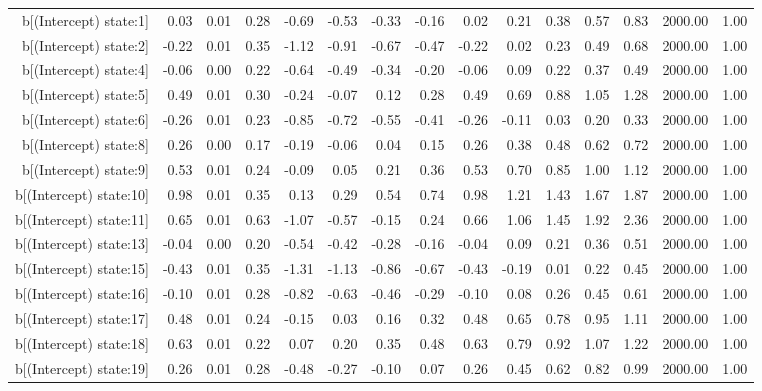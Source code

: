 \begin{table}[ht]
\begin{tabular}{rrrrrrrrrrrrrrr}
  b[(Intercept) state:1] & 0.03 & 0.01 & 0.28 & -0.69 & -0.53 & -0.33 & -0.16 & 0.02 & 0.21 & 0.38 & 0.57 & 0.83 & 2000.00 & 1.00 \\ 
  b[(Intercept) state:2] & -0.22 & 0.01 & 0.35 & -1.12 & -0.91 & -0.67 & -0.47 & -0.22 & 0.02 & 0.23 & 0.49 & 0.68 & 2000.00 & 1.00 \\ 
  b[(Intercept) state:4] & -0.06 & 0.00 & 0.22 & -0.64 & -0.49 & -0.34 & -0.20 & -0.06 & 0.09 & 0.22 & 0.37 & 0.49 & 2000.00 & 1.00 \\ 
  b[(Intercept) state:5] & 0.49 & 0.01 & 0.30 & -0.24 & -0.07 & 0.12 & 0.28 & 0.49 & 0.69 & 0.88 & 1.05 & 1.28 & 2000.00 & 1.00 \\ 
  b[(Intercept) state:6] & -0.26 & 0.01 & 0.23 & -0.85 & -0.72 & -0.55 & -0.41 & -0.26 & -0.11 & 0.03 & 0.20 & 0.33 & 2000.00 & 1.00 \\ 
  b[(Intercept) state:8] & 0.26 & 0.00 & 0.17 & -0.19 & -0.06 & 0.04 & 0.15 & 0.26 & 0.38 & 0.48 & 0.62 & 0.72 & 2000.00 & 1.00 \\ 
  b[(Intercept) state:9] & 0.53 & 0.01 & 0.24 & -0.09 & 0.05 & 0.21 & 0.36 & 0.53 & 0.70 & 0.85 & 1.00 & 1.12 & 2000.00 & 1.00 \\ 
  b[(Intercept) state:10] & 0.98 & 0.01 & 0.35 & 0.13 & 0.29 & 0.54 & 0.74 & 0.98 & 1.21 & 1.43 & 1.67 & 1.87 & 2000.00 & 1.00 \\ 
  b[(Intercept) state:11] & 0.65 & 0.01 & 0.63 & -1.07 & -0.57 & -0.15 & 0.24 & 0.66 & 1.06 & 1.45 & 1.92 & 2.36 & 2000.00 & 1.00 \\ 
  b[(Intercept) state:13] & -0.04 & 0.00 & 0.20 & -0.54 & -0.42 & -0.28 & -0.16 & -0.04 & 0.09 & 0.21 & 0.36 & 0.51 & 2000.00 & 1.00 \\ 
  b[(Intercept) state:15] & -0.43 & 0.01 & 0.35 & -1.31 & -1.13 & -0.86 & -0.67 & -0.43 & -0.19 & 0.01 & 0.22 & 0.45 & 2000.00 & 1.00 \\ 
  b[(Intercept) state:16] & -0.10 & 0.01 & 0.28 & -0.82 & -0.63 & -0.46 & -0.29 & -0.10 & 0.08 & 0.26 & 0.45 & 0.61 & 2000.00 & 1.00 \\ 
  b[(Intercept) state:17] & 0.48 & 0.01 & 0.24 & -0.15 & 0.03 & 0.16 & 0.32 & 0.48 & 0.65 & 0.78 & 0.95 & 1.11 & 2000.00 & 1.00 \\ 
  b[(Intercept) state:18] & 0.63 & 0.01 & 0.22 & 0.07 & 0.20 & 0.35 & 0.48 & 0.63 & 0.79 & 0.92 & 1.07 & 1.22 & 2000.00 & 1.00 \\ 
  b[(Intercept) state:19] & 0.26 & 0.01 & 0.28 & -0.48 & -0.27 & -0.10 & 0.07 & 0.26 & 0.45 & 0.62 & 0.82 & 0.99 & 2000.00 & 1.00 \\ 

\end{tabular}
\end{table}
